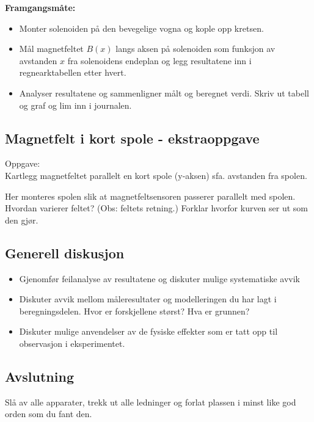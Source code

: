 \documentclass[../Elmag-labhefte-2020.tex]{subfiles}
\begin{document}
\textbf{Framgangsmåte:}
\vspace{-5mm}
\begin{itemize}
    \item Monter solenoiden på den bevegelige vogna og kople opp kretsen. 
    \item Mål magnetfeltet $B(x)$ langs aksen på solenoiden som funksjon av avstanden $x$ fra solenoidens endeplan og legg resultatene inn i regnearktabellen etter hvert.
    \item Analyser resultatene og sammenligner målt og beregnet verdi. Skriv ut tabell og graf og lim inn i journalen.
\end{itemize}

\subsection{Magnetfelt i kort spole - ekstraoppgave}

Oppgave:\\
{\itsf Kartlegg magnetfeltet parallelt en kort spole (y-aksen) sfa. avstanden fra spolen.}
 

Her monteres spolen slik at magnetfeltsensoren passerer parallelt med spolen. Hvordan varierer feltet? (Obs: feltets retning.) Forklar hvorfor kurven ser ut som den gjør.

\subsection{Generell diskusjon}

\begin{itemize}
   \item Gjenomfør feilanalyse av resultatene og diskuter mulige systematiske avvik
   \item Diskuter avvik mellom måleresultater og modelleringen du har lagt i beregningsdelen. Hvor er forskjellene størst? Hva er grunnen? 
    \item Diskuter mulige anvendelser av de fysiske effekter som er tatt opp til observasjon i eksperimentet. 
\end{itemize}

\subsection{Avslutning}

Slå av alle apparater, trekk ut alle ledninger og forlat plassen i minst like god orden som du fant den.
\end{document}
